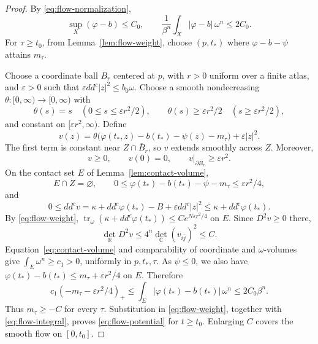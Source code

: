 \documentclass[reqno]{amsart}
\numberwithin{equation}{section}
\theoremstyle{definition}
\DeclareMathOperator{\tr}{tr}
\newcommand{\ddc}{dd^c}
\begin{document}
\begin{proof}
By \eqref{eq:flow-normalization},
\begin{equation}\label{eq:flow-integral}
 \sup_X(\varphi-b)\le C_0,\qquad
 \frac1{\beta^n}\int_X|\varphi-b|\,\omega^n\le2C_0.
\end{equation}
For $\tau\ge t_0$, from Lemma~\ref{lem:flow-weight}, choose 
$(p,t_*)$ where $\varphi-b-\psi$ attains $m_\tau$.

Choose a coordinate ball $B_r$ centered at $p$, with $r>0$ uniform
over a finite atlas, and $\varepsilon>0$ such that
$\varepsilon\ddc|z|^2\le b_0\omega$.
Choose a smooth nondecreasing $\theta:[0,\infty)\to[0,\infty)$ with
\[
 \theta(s)=s\quad(0\le s\le\varepsilon r^2/2),\qquad
 \theta(s)\ge\varepsilon r^2/2\quad(s\ge\varepsilon r^2/2),
\]
and constant on $[\varepsilon r^2,\infty)$. Define
\[
 v(z)=\theta\bigl(\varphi(t_*,z)-b(t_*)-\psi(z)-m_\tau\bigr)
          +\varepsilon|z|^2.
\]
The first term is constant near $Z\cap\overline B_r$, so $v$ extends
smoothly across $Z$. Moreover,
\[
 v\ge0,\qquad v(0)=0,\qquad
 v|_{\partial B_r}\ge\varepsilon r^2.
\]
On the contact set $E$ of Lemma~\ref{lem:contact-volume},
\[
 E\cap Z=\varnothing,\qquad
 0\le\varphi(t_*)-b(t_*)-\psi-m_\tau\le\varepsilon r^2/4,
\]
and
\[
 0\le\ddc v
 =\kappa+\ddc\varphi(t_*)-B+\varepsilon\ddc|z|^2
 \le\kappa+\ddc\varphi(t_*).
\]
By \eqref{eq:flow-weight},
$\tr_\omega(\kappa+\ddc\varphi(t_*))\le Ce^{N\varepsilon r^2/4}$ on $E$.
Since $D^2v\ge0$ there,
\[
 \det_{\mathbb R}D^2v
 \le4^n\det_{\mathbb C}(v_{i\bar j})^2\le C.
\]
Equation~\eqref{eq:contact-volume} and comparability of coordinate and
$\omega$-volumes give $\int_E\omega^n\ge c_1>0$, uniformly in
$p,t_*,\tau$. As $\psi\le0$, we also have
$\varphi(t_*)-b(t_*)\le m_\tau+\varepsilon r^2/4$ on $E$. Therefore
\[
 c_1(-m_\tau-\varepsilon r^2/4)_+
 \le\int_E|\varphi(t_*)-b(t_*)|\,\omega^n
 \le2C_0\beta^n.
\]
Thus $m_\tau\ge-C$ for every $\tau$. Substitution in
\eqref{eq:flow-weight}, together with \eqref{eq:flow-integral}, proves
\eqref{eq:flow-potential} for $t\ge t_0$.
Enlarging $C$ covers the smooth flow on $[0,t_0]$.
\end{proof}
\end{document}
